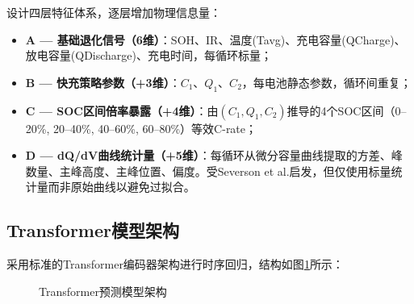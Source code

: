 \documentclass[12pt,a4paper]{ctexart}
\begin{document}
设计四层特征体系，逐层增加物理信息量：

\begin{itemize}[leftmargin=*]
    \item \textbf{A — 基础退化信号（6维）}：SOH、IR、温度(Tavg)、充电容量(QCharge)、放电容量(QDischarge)、充电时间，每循环标量；
    \item \textbf{B — 快充策略参数（+3维）}：$C_1$、$Q_1$、$C_2$，每电池静态参数，循环间重复；
    \item \textbf{C — SOC区间倍率暴露（+4维）}：由$(C_1, Q_1, C_2)$推导的4个SOC区间（0--20\%, 20--40\%, 40--60\%, 60--80\%）等效C-rate；
    \item \textbf{D — dQ/dV曲线统计量（+5维）}：每循环从微分容量曲线提取的方差、峰数量、主峰高度、主峰位置、偏度。受Severson et al.\cite{severson2019}启发，但仅使用标量统计量而非原始曲线以避免过拟合。
\end{itemize}

\subsection{Transformer模型架构}

采用标准的Transformer编码器架构进行时序回归，结构如图\ref{fig:transformer_arch}所示：

\begin{figure}[H]
\centering
\setlength{\fboxrule}{0.8pt}
\caption{Transformer预测模型架构}
\label{fig:transformer_arch}
\end{figure}
\end{document}
